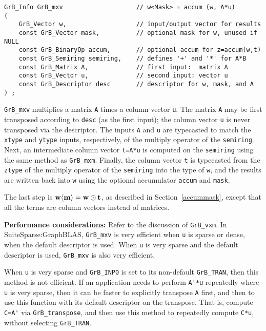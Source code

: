 \documentclass[12pt]{article}
\begin{document}
\begin{mdframed}[userdefinedwidth=6in]
{\footnotesize
\begin{verbatim}
GrB_Info GrB_mxv                    // w<Mask> = accum (w, A*u)
(
    GrB_Vector w,                   // input/output vector for results
    const GrB_Vector mask,          // optional mask for w, unused if NULL
    const GrB_BinaryOp accum,       // optional accum for z=accum(w,t)
    const GrB_Semiring semiring,    // defines '+' and '*' for A*B
    const GrB_Matrix A,             // first input:  matrix A
    const GrB_Vector u,             // second input: vector u
    const GrB_Descriptor desc       // descriptor for w, mask, and A
) ;
\end{verbatim} } \end{mdframed}

\verb'GrB_mxv' multiplies a matrix \verb'A' times a column vector \verb'u'.
The matrix \verb'A' may be first transposed according to \verb'desc' (as the
first input); the column vector \verb'u' is never transposed via the
descriptor.  The inputs \verb'A' and \verb'u' are typecasted to match the
\verb'xtype' and \verb'ytype' inputs, respectively, of the multiply operator of
the \verb'semiring'. Next, an intermediate column vector \verb't=A*u' is
computed on the \verb'semiring' using the same method as \verb'GrB_mxm'.
Finally, the column vector \verb't' is typecasted from the \verb'ztype' of the
multiply operator of the \verb'semiring' into the type of \verb'w', and the
results are written back into \verb'w' using the optional accumulator
\verb'accum' and \verb'mask'.

The last step is ${\bf w \langle m \rangle  = w \odot t}$, as described
in Section~\ref{accummask}, except that all the terms are column vectors instead
of matrices.

{\bf Performance considerations:}  Refer to the discussion of \verb'GrB_vxm'.
In SuiteSparse:GraphBLAS, \verb'GrB_mxv' is very efficient when \verb'u' is
sparse or dense, when the default descriptor is used.  When \verb'u' is very
sparse and the default descriptor is used, \verb'GrB_mxv' is also
very efficient.

When \verb'u' is very sparse and \verb'GrB_INP0' is set to its non-default
\verb'GrB_TRAN', then this method is not efficient.  If an application needs
to perform \verb"A'*u" repeatedly where \verb'u' is very sparse, then it
can be faster to explicitly transpose \verb'A' first, and then to use this
function with its default descriptor on the transpose.  That is, compute
\verb"C=A'" via \verb'GrB_transpose', and then use this method to 
repeatedly compute \verb'C*u', without selecting \verb'GrB_TRAN'.
\end{document}

